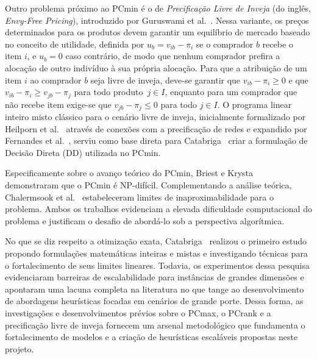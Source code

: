 Outro problema próximo ao PCmin é o de \emph{Precificação Livre de Inveja} (do inglês, \emph{Envy-Free Pricing}), introduzido por Guruswami et al.~\cite{venkatesan2005}. Nessa variante, os preços determinados para os produtos devem garantir um equilíbrio de mercado baseado no conceito de utilidade, definida por $u_b = v_{ib} - \pi_i$ se o comprador $b$ recebe o item $i$, e $u_b = 0$ caso contrário, de modo que nenhum comprador prefira a alocação de outro indivíduo à sua própria alocação. Para que a atribuição de um item $i$ ao comprador $b$ seja livre de inveja, deve-se garantir que $v_{ib} - \pi_i \ge 0$ e que $v_{ib} - \pi_i \ge v_{jb} - \pi_j$ para todo produto~$j \in I$, enquanto para um comprador que não recebe item exige-se que $v_{jb} - \pi_j \le 0$ para todo $j \in I$. O programa linear inteiro misto clássico para o cenário livre de inveja, inicialmente formalizado por Heilporn et al.~\cite{heilporn2010} através de conexões com a precificação de redes e expandido por Fernandes et al.~\cite{fernandes2016}, serviu como base direta para Catabriga~\cite{catabriga2025} criar a formulação de Decisão Direta (DD) utilizada no PCmin.

Especificamente sobre o avanço teórico do PCmin, Briest e Krysta~\cite{briest2007} demonstraram que o PCmin é NP-difícil. Complementando a análise teórica, Chalermsook et al.~\cite{chalermsook2012} estabeleceram limites de inaproximabilidade para o problema. Ambos os trabalhos evidenciam a elevada dificuldade computacional do problema e justificam o desafio de abordá-lo sob a perspectiva algorítmica.

No que se diz respeito a otimização exata, Catabriga~\cite{catabriga2025} realizou o primeiro estudo propondo formulações matemáticas inteiras e mistas e investigando técnicas para o fortalecimento de seus limites lineares. Todavia, os experimentos dessa pesquisa evidenciaram barreiras de escalabilidade para instâncias de grandes dimensões e apontaram uma lacuna completa na literatura no que tange ao desenvolvimento de abordagens heurísticas focadas em cenários de grande porte. Dessa forma, as investigações e desenvolvimentos prévios sobre o PCmax, o PCrank e a precificação livre de inveja fornecem um arsenal metodológico que fundamenta o fortalecimento de modelos e a criação de heurísticas escaláveis propostas neste projeto.


